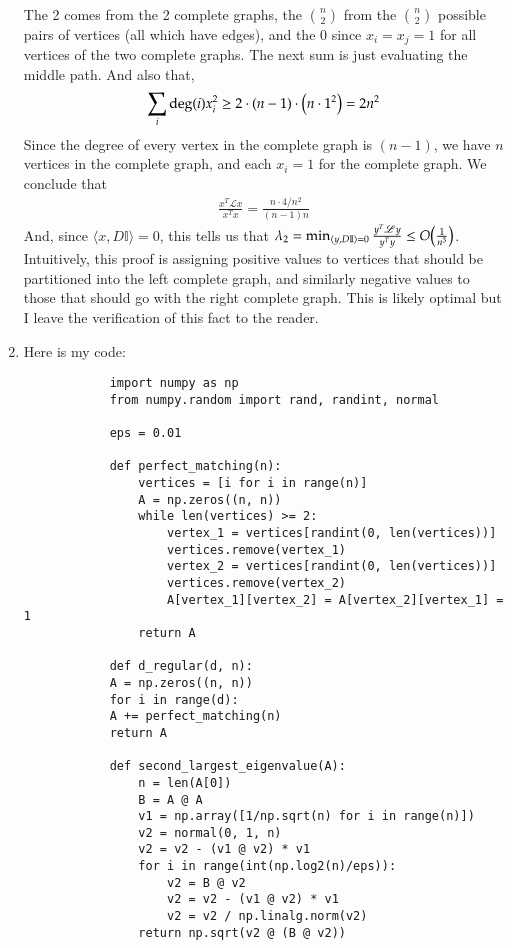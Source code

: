 \documentclass[12pt]{article}
\theoremstyle{definitionstyle}
\def\mbb#1{\mathbb{#1}}
\begin{document}
\begin{enumerate}[leftmargin=\labelsep]
\begin{align*}
		\end{align*}
		The 2 comes from the 2 complete graphs, the ${n \choose 2}$ from the ${n \choose 2}$ possible pairs of vertices (all which have edges), and the 0 since $x_i = x_j = 1$ for all vertices of the two complete graphs. The next sum is just evaluating the middle path.
		And also that,
		\begin{align*}
			\sum_{i} \deg(i) x_i^2 \geq 2 \cdot (n-1) \cdot \qty(n \cdot 1^2) = 2n^2
		\end{align*}
		Since the degree of every vertex in the complete graph is $(n-1)$, we have $n$ vertices in the complete graph, and each $x_i = 1$ for the complete graph. We conclude that
		\begin{align*}
			\frac{x^T\mathscr L x}{x^Tx} = \frac{n \cdot 4/n^2}{(n-1)n}
		\end{align*}
		And, since $\langle x, D\mbb I\rangle = 0$, this tells us that $\lambda_2 = \min_{\langle y, D\mbb I \rangle=0} \frac{y^T\mathscr L y}{y^Ty} \leq O\qty(\frac{1}{n^3})$. Intuitively, this proof is assigning positive values to vertices that should be partitioned into the left complete graph, and similarly negative values to those that should go with the right complete graph. This is likely optimal but I leave the verification of this fact to the reader.
		
		\item 
		Here is my code:
		\begin{lstlisting}
			import numpy as np
			from numpy.random import rand, randint, normal
			
			eps = 0.01
			
			def perfect_matching(n):
				vertices = [i for i in range(n)]
				A = np.zeros((n, n))
				while len(vertices) >= 2:
					vertex_1 = vertices[randint(0, len(vertices))]
					vertices.remove(vertex_1)
					vertex_2 = vertices[randint(0, len(vertices))]
					vertices.remove(vertex_2)
					A[vertex_1][vertex_2] = A[vertex_2][vertex_1] = 1
				return A
			
			def d_regular(d, n):
			A = np.zeros((n, n))
			for i in range(d):
			A += perfect_matching(n)
			return A
			
			def second_largest_eigenvalue(A):
				n = len(A[0])
				B = A @ A
				v1 = np.array([1/np.sqrt(n) for i in range(n)])
				v2 = normal(0, 1, n)
				v2 = v2 - (v1 @ v2) * v1
				for i in range(int(np.log2(n)/eps)):
					v2 = B @ v2
					v2 = v2 - (v1 @ v2) * v1
					v2 = v2 / np.linalg.norm(v2)
				return np.sqrt(v2 @ (B @ v2))
			

\end{lstlisting}
\end{enumerate}
\end{document}
